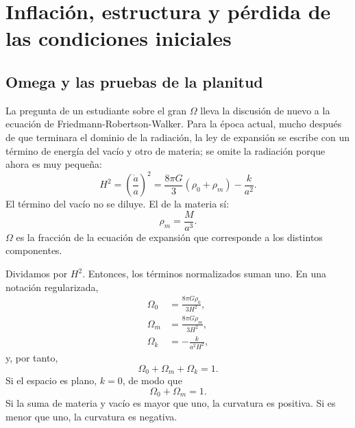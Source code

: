 \chapter{Inflación, estructura y pérdida de las condiciones iniciales}

\section{Omega y las pruebas de la planitud}

La pregunta de un estudiante sobre el gran \(\Omega\) lleva la discusión de nuevo a la ecuación de Friedmann-Robertson-Walker. Para la época actual, mucho después de que terminara el dominio de la radiación, la ley de expansión se escribe con un término de energía del vacío y otro de materia; se omite la radiación porque ahora es muy pequeña:
\begin{equation}
H^2=\left(\frac{\dot a}{a}\right)^2=\frac{8\pi G}{3}\left(\rho_0+\rho_m\right)-\frac{k}{a^2}.
\end{equation}
El término del vacío no se diluye. El de la materia sí:
\begin{equation}
\rho_m=\frac{M}{a^3}.
\end{equation}
\(\Omega\) es la fracción de la ecuación de expansión que corresponde a los distintos componentes.

Dividamos por \(H^2\). Entonces, los términos normalizados suman uno. En una notación regularizada,
\begin{equation}
\begin{aligned}
\Omega_0&=\frac{8\pi G\rho_0}{3H^2},\\
\Omega_m&=\frac{8\pi G\rho_m}{3H^2},\\
\Omega_k&=-\frac{k}{a^2H^2},
\end{aligned}
\end{equation}
y, por tanto,
\begin{equation}
\Omega_0+\Omega_m+\Omega_k=1.
\end{equation}
Si el espacio es plano, \(k=0\), de modo que
\begin{equation}
\Omega_0+\Omega_m=1.
\end{equation}
Si la suma de materia y vacío es mayor que uno, la curvatura es positiva. Si es menor que uno, la curvatura es negativa.

